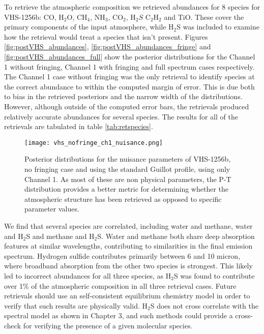 To retrieve the atmospheric composition we retrieved abundances for 8 species for VHS-1256b: CO, H$_{2}$O, CH$_{4}$, NH$_{3}$, CO$_{2}$, H$_{2}S$ C$_{2}$H$_{2}$ and TiO.
These cover the primary components of the input atmosphere, while H$_{2}$S was included to examine how the retrieval would treat a species that isn't present.
Figures \ref{fig:postVHS_abundances}, \ref{fig:postVHS_abundances_fringe} and \ref{fig:postVHS_abundances_full} show the posterior distributions for the Channel 1 without fringing, Channel 1 with fringing and full spectrum cases respectively. 
The Channel 1 case without fringing was the only retrieval to identify species at the correct abundance to within the computed margin of error.
This is due both to bias in the retrieved posteriors and the narrow width of the distributions.
However, although outside of the computed error bars, the retrievals produced relatively accurate abundances for several species. 
The results for all of the retrievals are tabulated in table \ref{tab:retspecies}. 
\begin{figure}[t]
	\centering
	\texttt{[image: vhs\_nofringe\_ch1\_nuisance.png]}
	\caption{Posterior distributions for the nuisance parameters of VHS-1256b, no fringing case and using the standard Guillot profile, using only Channel 1. As most of these are non physical parameters, the P-T distribution provides a better metric for determining whether the atmospheric structure has been retrieved as opposed to specific parameter values.}
	\label{fig:postVHS_nuisance}
\end{figure}

We find that several species are correlated, including water and methane, water and H$_{2}$S and methane and H$_{2}$S.
Water and methane both share deep absorption features at similar wavelengths, contributing to similarities in the final emission spectrum.
Hydrogen sulfide contributes primarily between 6 and 10 micron, where broadband absorption from the other two species is strongest.
This likely led to incorrect abundances for all three species, as H$_{2}$S was found to contribute over 1\% of the atmospheric composition in all three retrieval cases.
Future retrievals should use an self-consistent equilibrium chemistry model in order to verify that such results are physically valid. 
H$_{2}$S does not cross correlate with the spectral model as shown in Chapter 3, and such methods could provide a cross-check for verifying the presence of a given molecular species.

